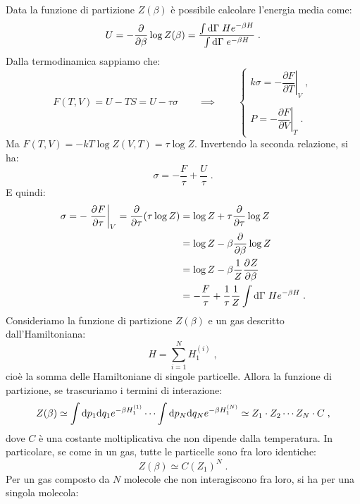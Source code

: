 Data la funzione di partizione $Z(\beta)$ è possibile calcolare l'energia media come:
\begin{equation}
U=-\frac{\partial}{\partial \beta}\log Z(\beta)=\frac{\int\diff[\Gamma]\;H e^{-\beta H}}{\int\diff[\Gamma]\;e^{-\beta H}}\;.
\end{equation}
Dalla termodinamica sappiamo che:
\begin{equation}
F(T,V) = U-TS = U-\tau\sigma\qquad \implies \qquad \begin{cases}
k\sigma = -\left.\dfrac{\partial F}{\partial T}\right|_V\;, \\
\\
P = -\left.\dfrac{\partial F}{\partial V}\right|_T\;.
\end{cases}
\end{equation}
Ma $F(T,V)=-kT\log Z(V,T)=\tau\log Z$. Invertendo la seconda relazione, si ha:
\begin{equation}
\sigma=-\frac{F}{\tau}+\frac{U}{\tau}\;.
\end{equation}
E quindi:
\begin{align}
\sigma=-\left.\pdev{F}{\tau}\right|_V=\frac{\partial}{\partial\tau}(\tau\log Z) &= \log Z+\tau\frac{\partial}{\partial\tau}\log Z \notag \\
&= \log Z-\beta\frac{\partial}{\partial\beta}\log Z  \notag \\
&= \log Z-\beta\frac{1}{Z}\pdev{Z}{\beta} \notag \\
&=-\frac{F}{\tau}+\frac{1}{\tau}\frac{1}{Z}\int \diff[\Gamma]\; H e^{-\beta H}\;.
\end{align}
Consideriamo la funzione di partizione $Z(\beta)$ e un gas descritto dall'Hamiltoniana:
\begin{equation}
H=\sum_{i=1}^N H_1^{(i)}\;,
\end{equation}
cioè la somma delle Hamiltoniane di singole particelle. Allora la funzione di partizione, se trascuriamo i termini di interazione:
\begin{equation}
Z(\beta)\simeq \int\diff[p]_1\diff[q]_1e^{-\beta H_1^{(1)}} \cdots \int \diff[p]_N\diff[q]_N e^{-\beta H_1^{(N)}}\simeq Z_1\cdot Z_2 \cdots Z_N \cdot C\;,
\end{equation}
dove $C$ è una costante moltiplicativa che non dipende dalla temperatura. In particolare, se come in un gas, tutte le particelle sono fra loro identiche:
\begin{equation}
Z(\beta)\simeq C(Z_1)^N\;.
\end{equation}
Per un gas composto da $N$ molecole che non interagiscono fra loro, si ha per una singola molecola:

